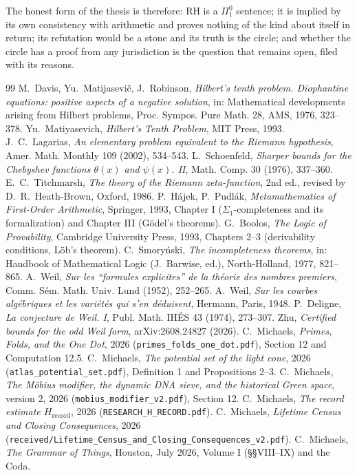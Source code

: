 \documentclass[11pt]{article}
\theoremstyle{definition}
\theoremstyle{remark}
\newcommand{\RH}{\mathrm{RH}}
\newcommand{\Pione}{\Pi^0_1}
\begin{document}
The honest form of the thesis is therefore: $\RH$ is a $\Pione$ sentence; it is implied by its own consistency with arithmetic and proves nothing of the kind about itself in return; its refutation would be a stone and its truth is the circle; and whether the circle has a proof from any jurisdiction is the question that remains open, filed with its reasons.

\begin{thebibliography}{99}
 M.~Davis, Yu.~Matijasevi\v{c}, J.~Robinson, \emph{Hilbert's tenth problem. Diophantine equations: positive aspects of a negative solution}, in: Mathematical developments arising from Hilbert problems, Proc. Sympos. Pure Math. 28, AMS, 1976, 323--378.
 Yu.~Matiyasevich, \emph{Hilbert's Tenth Problem}, MIT Press, 1993.
 J.~C.~Lagarias, \emph{An elementary problem equivalent to the Riemann hypothesis}, Amer. Math. Monthly 109 (2002), 534--543.
 L.~Schoenfeld, \emph{Sharper bounds for the Chebyshev functions $\theta(x)$ and $\psi(x)$. II}, Math. Comp. 30 (1976), 337--360.
 E.~C.~Titchmarsh, \emph{The theory of the Riemann zeta-function}, 2nd ed., revised by D.~R.~Heath-Brown, Oxford, 1986.
 P.~H\'ajek, P.~Pudl\'ak, \emph{Metamathematics of First-Order Arithmetic}, Springer, 1993, Chapter I ($\Sigma_1$-completeness and its formalization) and Chapter III (G\"odel's theorems).
 G.~Boolos, \emph{The Logic of Provability}, Cambridge University Press, 1993, Chapters 2--3 (derivability conditions, L\"ob's theorem).
 C.~Smory\'nski, \emph{The incompleteness theorems}, in: Handbook of Mathematical Logic (J.~Barwise, ed.), North-Holland, 1977, 821--865.
 A.~Weil, \emph{Sur les ``formules explicites'' de la th\'eorie des nombres premiers}, Comm. S\'em. Math. Univ. Lund (1952), 252--265.
 A.~Weil, \emph{Sur les courbes alg\'ebriques et les vari\'et\'es qui s'en d\'eduisent}, Hermann, Paris, 1948.
 P.~Deligne, \emph{La conjecture de Weil. I}, Publ. Math. IH\'ES 43 (1974), 273--307.
 Zhu, \emph{Certified bounds for the odd Weil form}, arXiv:2608.24827 (2026).
 C.~Michaels, \emph{Primes, Folds, and the One Dot}, 2026 (\texttt{primes\_folds\_one\_dot.pdf}), Section 12 and Computation 12.5.
 C.~Michaels, \emph{The potential set of the light cone}, 2026 (\texttt{atlas\_potential\_set.pdf}), Definition 1 and Propositions 2--3.
 C.~Michaels, \emph{The M\"obius modifier, the dynamic DNA sieve, and the historical Green space}, version 2, 2026 (\texttt{mobius\_modifier\_v2.pdf}), Section 12.
 C.~Michaels, \emph{The record estimate $H_{\mathrm{record}}$}, 2026 (\texttt{RESEARCH\_H\_RECORD.pdf}).
 C.~Michaels, \emph{Lifetime Census and Closing Consequences}, 2026 (\texttt{received/Lifetime\_Census\_and\_Closing\_Consequences\_v2.pdf}).
 C.~Michaels, \emph{The Grammar of Things}, Houston, July 2026, Volume I (\S\S VIII--IX) and the Coda.
\end{thebibliography}
\end{document}
